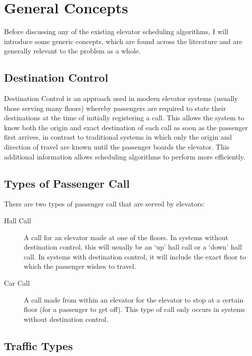 \documentclass{UoYCSproject}
\begin{document}
\section{General Concepts}

Before discussing any of the existing elevator scheduling algorithms, I will introduce some generic concepts, which are found across the literature and are generally relevant to the problem as a whole.

\subsection{Destination Control}

Destination Control is an approach used in modern elevator systems (usually those serving many floors) whereby passengers are required to state their destinations at the time of initially registering a call.  This allows the system to know both the origin and exact destination of each call as soon as the passenger first arrives, in contrast to traditional systems in which only the origin and direction of travel are known until the passenger boards the elevator.  This additional information allows scheduling algorithms to perform more efficiently.  \citep{Koehler2002}

\subsection{Types of Passenger Call}

There are two types of passenger call that are served by elevators:  \citep{Gagov2001, Bao1994}

\begin{description}
	\item[Hall Call] A call for an elevator made at one of the floors.  In systems without destination control, this will usually be an `up' hall call or a `down' hall call.  In systems with destination control, it will include the exact floor to which the passenger wishes to travel.
	\item[Car Call] A call made from within an elevator for the elevator to stop at a certain floor (for a passenger to get off).  This type of call only occurs in systems without destination control.
\end{description}

\subsection{Traffic Types}
\end{document}
